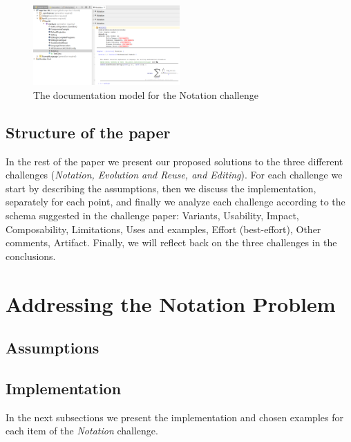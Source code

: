 \documentclass[preprint,numbers,10pt]{sigplanconf}
\begin{document}
\begin{figure}[H]
	\centering
	\includegraphics[width=0.50\textwidth]{screens/OpenNotation.png}
	\caption{The documentation model for the Notation challenge}
	\label{fig:opennotation}
\end{figure}

\subsection{Structure of the paper}

In the rest of the paper we present our proposed solutions to the
three different challenges (\emph{Notation, Evolution and Reuse, and Editing}).
For each challenge we start by describing the assumptions, then we
discuss the implementation, separately for each point, and finally we
analyze each challenge according to the schema suggested in the challenge
paper\cite{erdweg2015evaluating}:
Variants, Usability, Impact, Composability, Limitations, Uses and examples, Effort (best-effort), Other
comments, Artifact.
Finally, we will reflect back on the three challenges in the conclusions.

%
%

\section{Addressing the Notation Problem}

\subsection{Assumptions}

\subsection{Implementation}
In the next subsections we present the implementation and chosen examples for each
item of the \emph{Notation} challenge.
\end{document}
